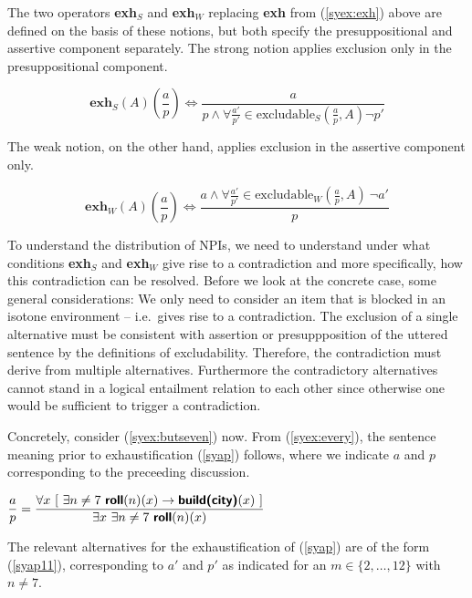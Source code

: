 \documentclass[output=paper,colorlinks,citecolor=brown,
]{langscibook}
\begin{document}
The two operators \textbf{exh}$_{S}$ and \textbf{exh}$_{W}$ replacing \textbf{exh} from (\ref{syex:exh}) above are defined on the basis of these notions, but both specify the presuppositional and assertive component separately. The strong notion applies exclusion only in the presuppositional component.

\begin{equation*}
\textbf{exh}_S(A)\left(\frac{a}{p}\right) \Leftrightarrow \frac{a}{p \land \forall \frac{a'}{p'} \in \text{excludable}_S\left(\frac{a}{p},A\right) \neg p'}
\end{equation*}

The weak notion, on the other hand, applies exclusion in the assertive component only.  

\begin{equation*}
\textbf{exh}_W(A)\left(\frac{a}{p}\right) \Leftrightarrow \frac{a \land \forall \frac{a'}{p'}  \in \text{excludable}_W\left(\frac{a}{p},A\right) \ \neg a'}{p}
\end{equation*}

To understand the distribution of NPIs, we need to understand under what conditions  \textbf{exh}$_S$ and \textbf{exh}$_W$ give rise to a contradiction and more specifically, how this contradiction can be resolved.  Before we look at the concrete case, some general considerations: We only need to consider an item that is blocked  in an isotone environment -- i.e.\ gives rise to a contradiction.
The exclusion of a single alternative must be consistent with assertion or presuppposition of the uttered sentence by the definitions of excludability.  Therefore, the contradiction must derive from multiple alternatives.  Furthermore the contradictory alternatives cannot stand in a logical entailment relation to each other since otherwise one would be sufficient to trigger a contradiction.

Concretely, consider (\ref{syex:butseven}) now.  From (\ref{syex:every}), the sentence meaning prior to exhaustification (\ref{syap}) follows, where we indicate $a$ and $p$ corresponding to the preceeding discussion. 

\ea \label{syap}$\displaystyle \frac{a}{p} = 
\frac{\forall x\ [\ \exists n \neq 7\  \textsf{\textbf{roll}}(n)(x)  \rightarrow \textsf{\textbf{build(city)}}(x)\ ]}{\exists x\  \exists n \neq 7\  \textsf{\textbf{roll}}(n)(x)}$
\z

The relevant  alternatives for the exhaustification of (\ref{syap}) are of the form (\ref{syap11}), corresponding to $a'$ and $p'$ as indicated for an $m \in \{2, \dots, 12\}$ with $n \neq 7$.
\end{document}
